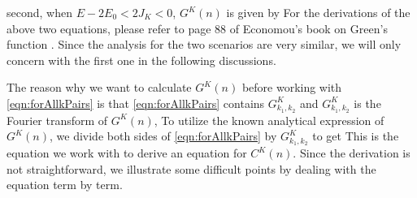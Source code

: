 second, when $E - 2 E_0 < 2 J_K < 0$, $G^{K}(n)$ is given by
For the derivations of the above two equations, please refer to page 88 of Economou's book on Green's function
 \cite{economou2006}. Since the analysis for the two  scenarios are very similar, we will only concern with the first one
in the following discussions. 

The reason why we want to calculate $G^{K}(n)$ before working with \autoref{eqn:forAllkPairs} is that
 \autoref{eqn:forAllkPairs}  contains $G^{K}_{k_1, k_2}$ and $G^{K}_{k_1, k_2}$ is the Fourier transform of  $G^{K}(n)$,
To utilize the known analytical expression of $G^{K}(n)$, we divide both sides of \autoref{eqn:forAllkPairs} by
$G^{K}_{k_1, k_2}$ to get
This is the equation we work with to derive an equation for $C^{K}(n)$. Since the derivation is not straightforward, we
illustrate some difficult points by dealing with the equation term by term.  

